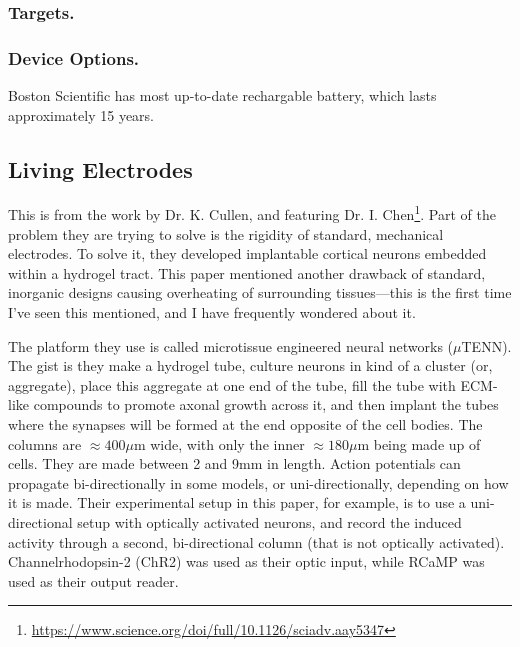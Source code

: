 \documentclass[12pt]{report}
\begin{document}
\subsubsection{Targets.}



\subsubsection{Device Options.}

Boston Scientific has most up-to-date rechargable battery, which lasts approximately 15 years. 
 



\subsection{Living Electrodes}

This is from the work by Dr. K. Cullen, and featuring Dr. I. Chen\footnote{\url{https://www.science.org/doi/full/10.1126/sciadv.aay5347}}. Part of the problem they are trying to solve is the rigidity of standard, mechanical electrodes. To solve it, they developed implantable cortical neurons embedded within a hydrogel tract. This paper mentioned another drawback of standard, inorganic designs causing overheating of surrounding tissues---this is the first time I've seen this mentioned, and I have frequently wondered about it.\newline

The platform they use is called microtissue engineered neural networks ($\mu$TENN). The gist is they make a hydrogel tube, culture neurons in kind of a cluster (or, aggregate), place this aggregate at one end of the tube, fill the tube with ECM-like compounds to promote axonal growth across it, and then implant the tubes where the synapses will be formed at the end opposite of the cell bodies. The columns are $\approx 400\mu$m wide, with only the inner $\approx 180\mu$m being made up of cells. They are made between 2 and 9mm in length. Action potentials can propagate bi-directionally in some models, or uni-directionally, depending on how it is made. Their experimental setup in this paper, for example, is to use a uni-directional setup with optically activated neurons, and record the induced activity through a second, bi-directional column (that is not optically activated). Channelrhodopsin-2 (ChR2) was used as their optic input, while RCaMP was used as their output reader. \newline
\end{document}
